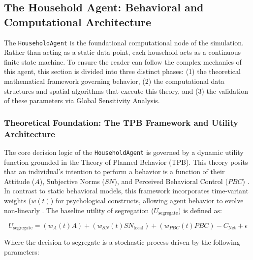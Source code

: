 \subsection{The Household Agent: Behavioral and Computational Architecture}

The \texttt{HouseholdAgent} is the foundational computational node of the simulation. Rather than acting as a static data point, each household acts as a continuous finite state machine. To ensure the reader can follow the complex mechanics of this agent, this section is divided into three distinct phases: (1) the theoretical mathematical framework governing behavior, (2) the computational data structures and spatial algorithms that execute this theory, and (3) the validation of these parameters via Global Sensitivity Analysis.

\subsubsection{Theoretical Foundation: The TPB Framework and Utility Architecture}

The core decision logic of the \texttt{HouseholdAgent} is governed by a dynamic utility function grounded in the Theory of Planned Behavior (TPB). This theory posits that an individual's intention to perform a behavior is a function of their Attitude ($A$), Subjective Norms ($SN$), and Perceived Behavioral Control ($PBC$) \citep{Ceschi2021}. In contrast to static behavioral models, this framework incorporates time-variant weights ($w(t)$) for psychological constructs, allowing agent behavior to evolve non-linearly \citep{Taraghi2025, Ma2023}. The baseline utility of segregation ($U_{\mathrm{segregate}}$) is defined as:

\begin{equation}
    U_{\mathrm{segregate}} = (w_A(t) A) + (w_{SN}(t) SN_{\mathrm{local}}) + (w_{PBC}(t)  PBC) - C_{\mathrm{Net}} + \epsilon
    \label{eq:utility_function}
\end{equation}

Where the decision to segregate is a stochastic process driven by the following parameters:

